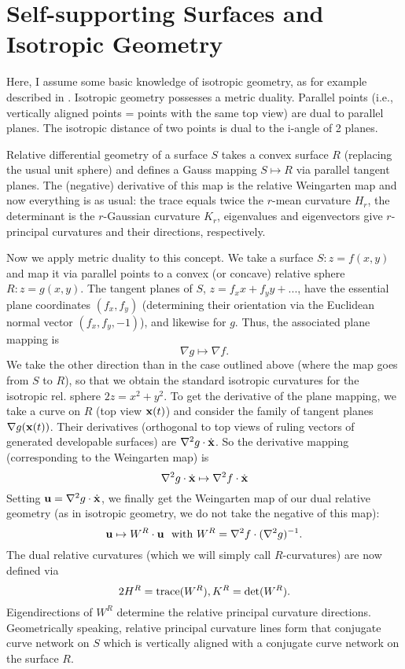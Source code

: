 \documentclass[annual]{acmsiggraph}
\def\be{\begin{equation}}
\def\ee{\end{equation}}
\begin{document}
\section{Self-supporting Surfaces and Isotropic Geometry} \label{sec:smooth}


Here, I assume some basic knowledge of isotropic geometry, as for example described in
\cite{Pottmann2007}. Isotropic geometry possesses a metric duality. Parallel points (i.e., vertically
aligned points = points with the same top view) are dual to parallel planes. The isotropic distance
of two points is dual to the i-angle of 2 planes. 

Relative differential geometry of a surface $S$ takes a convex surface $R$ (replacing the usual unit sphere) and
defines a Gauss mapping $S \mapsto R$ via parallel tangent planes. The (negative) derivative of this
map is the relative Weingarten map and now everything is as usual: the trace equals twice the
 $r$-mean curvature $H_r$, the determinant
is the $r$-Gaussian curvature $K_r$, eigenvalues and eigenvectors give $r$-principal curvatures and
their directions, respectively.

Now we apply metric duality to this concept. We take a surface $S: z=f(x,y)$ and map it via parallel
points to a convex (or concave) relative sphere $R: z=g(x,y)$. The tangent planes of $S$, $z=f_x x+f_y y+ ...$, have
the essential plane coordinates $(f_x,f_y)$ (determining their orientation via the Euclidean normal vector $(f_x,f_y,-1)$), and likewise for $g$. Thus, the associated plane
mapping is
%
\be \nabla g \mapsto \nabla f. \ee
%
We take the other direction than in the case outlined above (where the map goes from $S$ to $R$), so that we obtain the standard isotropic curvatures for the isotropic rel. sphere $2z=x^2+y^2$.
To get the derivative of the plane mapping, we take a curve on $R$ (top view ${\mathbf x}(t)$) and consider the family of tangent
planes $\nabla g({\mathbf x}(t))$. Their derivatives (orthogonal to top views of ruling vectors of generated developable
surfaces) are $\nabla^2 g  \cdot \dot{{\mathbf x}}$. So the derivative mapping (corresponding to the Weingarten
map) is 
%
$$ \nabla^2g \cdot \dot{{\mathbf x}} \mapsto \nabla^2f \cdot \dot{{\mathbf x}}$$
%
Setting ${\mathbf u}=\nabla^2g \cdot \dot{{\mathbf x}}$, we finally get the Weingarten map of our dual relative geometry (as
in isotropic geometry, we do not take the negative of this map):
%
\be \uw \mapsto W^R \cdot \uw \ \ {\rm with} \ W^R=\nabla^2 f \cdot ( \nabla^2 g)^{-1}. \ee
%
The dual relative curvatures (which we will simply call $R$-curvatures) are now defined via
%
\be 2 H^R = {\rm trace}(W^R), K^R=\det(W^R). \ee
%
Eigendirections of $W^R$ determine the relative principal curvature directions. Geometrically speaking, relative principal curvature
lines form that conjugate curve network on $S$ which is vertically aligned with a conjugate
curve network on the surface $R$. 
\end{document}
